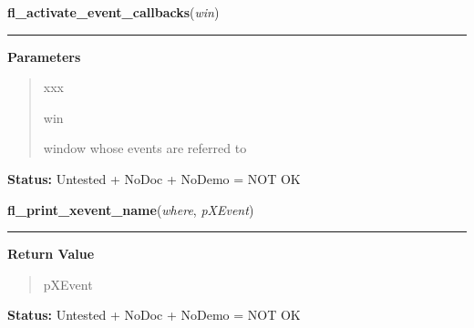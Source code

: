 \hspace{.8\funcindent}\begin{boxedminipage}{\funcwidth}

    \raggedright \textbf{fl\_activate\_event\_callbacks}(\textit{win})

    \vspace{-1.5ex}

    \rule{\textwidth}{0.5\fboxrule}
\setlength{\parskip}{2ex}
\setlength{\parskip}{1ex}
      \textbf{Parameters}
      \vspace{-1ex}

      \begin{quote}
        \begin{Ventry}{xxx}

          \item[win]

          window whose events are referred to

        \end{Ventry}

      \end{quote}

\textbf{Status:} Untested + NoDoc + NoDemo = NOT OK



    \end{boxedminipage}

    \label{xformslib:library:fl_print_xevent_name}

    \vspace{0.5ex}

\hspace{.8\funcindent}\begin{boxedminipage}{\funcwidth}

    \raggedright \textbf{fl\_print\_xevent\_name}(\textit{where}, \textit{pXEvent})

    \vspace{-1.5ex}

    \rule{\textwidth}{0.5\fboxrule}
\setlength{\parskip}{2ex}
\setlength{\parskip}{1ex}
      \textbf{Return Value}
    \vspace{-1ex}

      \begin{quote}
      pXEvent

      \end{quote}

\textbf{Status:} Untested + NoDoc + NoDemo = NOT OK



    \end{boxedminipage}

